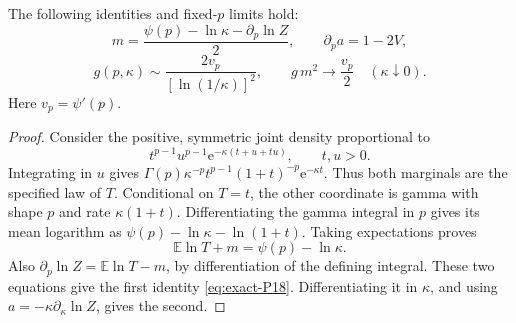 \begin{proposition}\label{prop:exact-P6} The following identities and fixed-\(p\) limits hold:
\begin{equation}
 m=\frac{\psi(p)-\ln\kappa-\partial_p\ln Z}{2},
 \qquad \partial_p a=1-2V,                            \label{eq:exact-P18}
\end{equation}
\begin{equation}
 g(p,\kappa)\sim\frac{2v_p}{[\ln(1/\kappa)]^2},
 \qquad g\,m^2\longrightarrow\frac{v_p}{2}
 \quad(\kappa\downarrow0).                           \label{eq:exact-P19}
\end{equation}
Here \(v_p=\psi'(p)\).

\end{proposition}
\begin{proof} Consider the positive, symmetric joint density proportional to
\begin{equation}
 t^{p-1}u^{p-1}\mathrm{e}^{-\kappa(t+u+tu)},\qquad t,u>0.
\end{equation}
Integrating in \(u\) gives
\(\Gamma(p)\kappa^{-p}t^{p-1}(1+t)^{-p}\mathrm{e}^{-\kappa t}\).
Thus both marginals are the specified law of \(T\). Conditional on \(T=t\), the other coordinate is gamma with shape \(p\) and rate \(\kappa(1+t)\). Differentiating the gamma integral in \(p\) gives its mean logarithm as
\(\psi(p)-\ln\kappa-\ln(1+t)\). Taking expectations proves
\begin{equation}
 \mathbb{E}\ln T+m=\psi(p)-\ln\kappa.
\end{equation}
Also \(\partial_p\ln Z=\mathbb{E}\ln T-m\), by differentiation of the defining integral. These two equations give the first identity \eqref{eq:exact-P18}. Differentiating it in \(\kappa\), and using
\(a=-\kappa\partial_\kappa\ln Z\), gives the second.


\end{proof}
